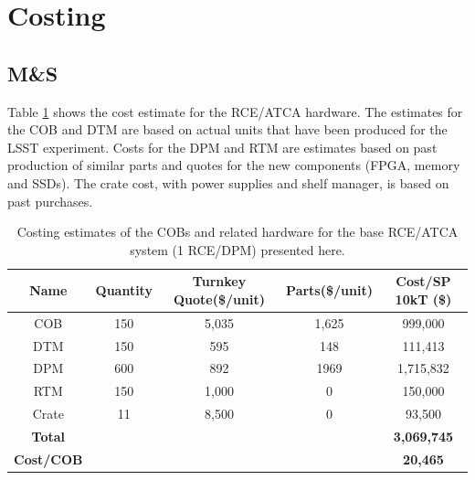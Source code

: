 %

\section{Costing}

\subsection{M\&S}

Table \ref{tab:baseMScost} shows the cost estimate for the RCE/ATCA hardware.  The estimates for the COB and DTM are based on actual units that have been produced for the LSST experiment.  Costs for the DPM and RTM are estimates based on past production of similar parts and quotes for the new components (FPGA, memory and SSDs).  The crate cost,  with power supplies and shelf manager, is based on past purchases.  

\begin{table}[htp]
\begin{center}
\begin{tabular}{|c|c|c|c|c|}
\hline
 Name  & Quantity & Turnkey Quote(\$/unit)      & Parts(\$/unit)            &     Cost/SP 10kT (\$) \\
  \hline
COB		&  150 	&	5,035		&	1,625		&	999,000\\
\hline
DTM		&  150 	&	595		&	148		&	111,413\\
\hline
DPM		&   600	&	892		&	1969		&1,715,832	\\
\hline
RTM		&   150	&	1,000		&	0		&150,000	\\
\hline
Crate		&   11	&	8,500		&	0	&	93,500	\\
\hline
\hline
{\bf Total } &	\multicolumn{3}{r|}{} & {\bf 3,069,745}   \\
\hline
{\bf Cost/COB }& 	\multicolumn{3}{r|}{} &  {\bf  20,465 }  \\
\hline
\end{tabular}
\end{center}
\caption{ Costing estimates of the COBs and related hardware for the base RCE/ATCA system (1 RCE/DPM) presented here. }
\label{tab:baseMScost}
\end{table}%

